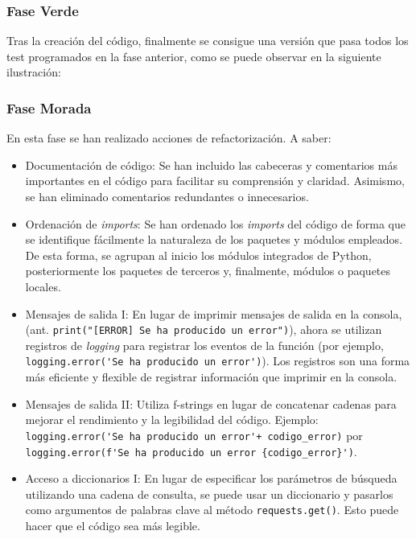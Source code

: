 \subsubsection{Fase Verde}
Tras la creación del código, finalmente se consigue una versión que pasa todos los test programados en la fase anterior, como se puede observar en la siguiente ilustración:


\subsubsection{Fase Morada}
En esta fase se han realizado acciones de refactorización. A saber:

\begin{itemize}
    \item Documentación de código:
    Se han incluido las cabeceras y comentarios más importantes en el código para facilitar su comprensión y claridad. Asimismo, se han eliminado comentarios redundantes o innecesarios.

    \item Ordenación de \textit{imports}:
    Se han ordenado los \textit{imports} del código de forma que se identifique fácilmente la naturaleza de los paquetes y módulos empleados. De esta forma, se agrupan al inicio los módulos integrados de Python, posteriormente los paquetes de terceros y, finalmente, módulos o paquetes locales.
    
    \item Mensajes de salida I:
    En lugar de imprimir mensajes de salida en la consola, (ant. \verb|print("[ERROR] Se ha producido un error")|), ahora se utilizan registros de \textit{logging} para registrar los eventos de la función (por ejemplo, \verb|logging.error('Se ha producido un error')|). Los registros son una forma más eficiente y flexible de registrar información que imprimir en la consola.
        
    \item Mensajes de salida II:
    Utiliza f-strings en lugar de concatenar cadenas para mejorar el rendimiento y la legibilidad del código. Ejemplo: \verb|logging.error('Se ha producido un error'+ codigo_error)| por \verb|logging.error(f'Se ha producido un error {codigo_error}')|.

    \item Acceso a diccionarios I:
    En lugar de especificar los parámetros de búsqueda utilizando una cadena de consulta, se puede usar un diccionario y pasarlos como argumentos de palabras clave al método \verb|requests.get()|. Esto puede hacer que el código sea más legible.


\end{itemize}
